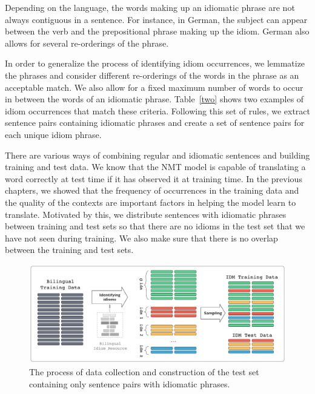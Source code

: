 Depending on the language, the words making up an idiomatic phrase are not always contiguous in a sentence. 
For instance, in German, the subject can appear between the verb and the prepositional phrase making up the idiom. 
German also allows for several re-orderings of the phrase.

In order to generalize the process of identifying idiom occurrences, we lemmatize the phrases and consider different re-orderings of the words in the phrase as an acceptable match. 
We also allow for a fixed maximum number of words to occur in between the words of an idiomatic phrase.
Table~\ref{two} shows two examples of idiom occurrences that match these criteria.
Following this set of rules, we extract sentence pairs containing idiomatic phrases and create a set of sentence pairs for each unique idiom phrase.


There are various ways of combining regular and idiomatic sentences and building training and test data. 
We know that the NMT model is capable of translating a word correctly at test time if it has observed it at training time.
In the previous chapters, we showed that the frequency of occurrences in the training data and the quality of the contexts are important factors in helping the model learn to translate. 
Motivated by this, we distribute sentences with idiomatic phrases between training and test sets so that there are no idioms in the test set that we have not {seen} during training.
We also make sure that there is no overlap between the training and test sets. 

\begin{figure}[hbt!]
\centering
\includegraphics[width=0.95\linewidth]{06-research-04/figs/data.pdf}
\caption{The process of data collection and construction of the test set containing only sentence pairs with idiomatic phrases.}
\label{augfig2}
\end{figure}

